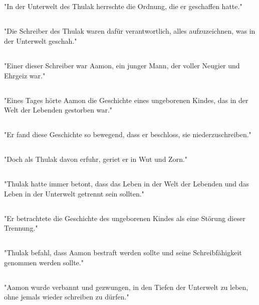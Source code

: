 \documentclass{article}
\begin{document}
\subsection{}
"In der Unterwelt des Thulak herrschte die Ordnung, die er geschaffen hatte."
\subsection{}
"Die Schreiber des Thulak waren dafür verantwortlich, alles aufzuzeichnen, was in der Unterwelt geschah."
\subsection{}
"Einer dieser Schreiber war Aamon, ein junger Mann, der voller Neugier und Ehrgeiz war."
\subsection{}
"Eines Tages hörte Aamon die Geschichte eines ungeborenen Kindes, das in der Welt der Lebenden gestorben war."
\subsection{}
"Er fand diese Geschichte so bewegend, dass er beschloss, sie niederzuschreiben."
\subsection{}
"Doch als Thulak davon erfuhr, geriet er in Wut und Zorn."
\subsection{}
"Thulak hatte immer betont, dass das Leben in der Welt der Lebenden und das Leben in der Unterwelt getrennt sein sollten."
\subsection{}
"Er betrachtete die Geschichte des ungeborenen Kindes als eine Störung dieser Trennung."
\subsection{}
"Thulak befahl, dass Aamon bestraft werden sollte und seine Schreibfähigkeit genommen werden sollte."
\subsection{}
"Aamon wurde verbannt und gezwungen, in den Tiefen der Unterwelt zu leben, ohne jemals wieder schreiben zu dürfen."
\end{document}
